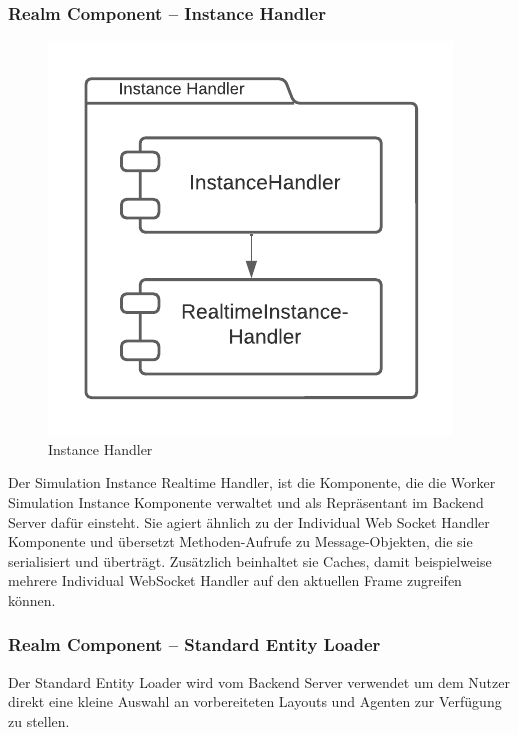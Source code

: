 \subsubsection{Realm Component – Instance Handler}

\begin{figure}[htb]
    \centering
    \includegraphics[scale=.65,center]{medien/instance-handler.pdf}
    \caption{Instance Handler}
    \ownsource
    \label{fig:instance-handler}
\end{figure}

\FloatBarrier

Der Simulation Instance Realtime Handler, ist die Komponente, die die Worker Simulation Instance Komponente verwaltet und als Repräsentant im Backend Server dafür einsteht.
Sie agiert ähnlich zu der Individual Web Socket Handler Komponente und übersetzt Methoden-Aufrufe zu Message-Objekten, die sie serialisiert und überträgt.
Zusätzlich beinhaltet sie Caches, damit beispielweise mehrere Individual WebSocket Handler auf den aktuellen Frame zugreifen können.

\subsubsection{Realm Component – Standard Entity Loader}

Der Standard Entity Loader wird vom Backend Server verwendet um dem Nutzer direkt eine kleine Auswahl an vorbereiteten Layouts und Agenten zur Verfügung zu stellen.

